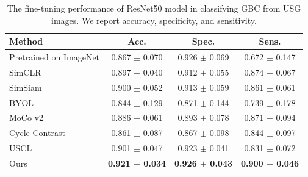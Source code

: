 %
%
\begin{table}[t]
	\centering
    \footnotesize
	\setlength{\tabcolsep}{10pt}
	\begin{tabular}{lccc}
		\toprule
		\textbf{Method}	& \textbf{Acc.} & \textbf{Spec.} & \textbf{Sens.} \\
		\midrule
		Pretrained on ImageNet \cite{imagenet} & 0.867 $\pm$ 0.070 & 0.926 $\pm$ 0.069 & 0.672 $\pm$ 0.147 \\
		\midrule
		SimCLR \cite{simclr} & 0.897 $\pm$ 0.040 & 0.912 $\pm$ 0.055 & 0.874 $\pm$ 0.067  \\
		SimSiam \cite{simsiam} & 0.900 $\pm$ 0.052 & 0.913 $\pm$ 0.059 & 0.861 $\pm$ 0.061 \\
		BYOL \cite{byol} & 0.844 $\pm$ 0.129 & 0.871 $\pm$ 0.144 & 0.739 $\pm$ 0.178 \\
		MoCo v2\cite{moco} & 0.886 $\pm$ 0.061 & 0.893 $\pm$ 0.078 & 0.871 $\pm$ 0.094 \\
		Cycle-Contrast \cite{cyclecontrast} & 0.861 $\pm$ 0.087 & 0.867 $\pm$ 0.098 & 0.844 $\pm$ 0.097 \\
		USCL \cite{uscl} & 0.901 $\pm$ 0.047 & 0.923 $\pm$ 0.041 & 0.831 $\pm$ 0.072 \\
		\midrule%
		Ours & \textbf{0.921 $\pm$ 0.034} & \textbf{0.926 $\pm$ 0.043} & \textbf{0.900 $\pm$ 0.046} \\
		\bottomrule
	\end{tabular}
    \caption[Comparison of the proposed contrastive framework with SOTA on GBC detection]{The fine-tuning performance of ResNet50 model in classifying GBC from USG images. We report accuracy, specificity, and sensitivity.}
	\label{usucl_tab:key_results}
\end{table}

